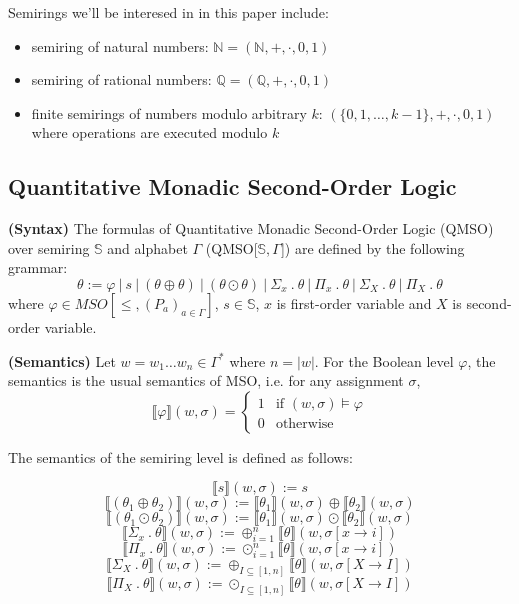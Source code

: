 \documentclass[12pt]{article}
\theoremstyle{definition}
\begin{document}
Semirings we'll be interesed in in this paper include:

\begin{itemize}
    \item semiring of natural numbers: $\mathbb{N} = (\mathbb{N}, +, \cdot, 0, 1)$
    \item semiring of rational numbers: $\mathbb{Q} = (\mathbb{Q}, +, \cdot, 0, 1)$
    \item finite semirings of numbers modulo arbitrary $k$: $(\{0,1,\ldots,k-1\}, +, \cdot, 0, 1)$ where operations are executed modulo $k$
\end{itemize}

\subsection{Quantitative Monadic Second-Order Logic}

\textbf{(Syntax)} The formulas of Quantitative Monadic Second-Order Logic (QMSO) over semiring $\mathbb{S}$ and alphabet $\Gamma$ (QMSO[$\mathbb{S}, \Gamma$]) are defined by the following grammar:
$$ \theta := \varphi \ | \ s \ | \ (\theta \oplus \theta) \ | \ (\theta \odot \theta) \ | \ \Sigma_x \ . \ \theta \ | \ \Pi_x \ . \ \theta \ | \ \Sigma_X \ . \ \theta \ | \ \Pi_X \ . \ \theta$$
where $\varphi \in MSO[\leq, (P_a)_{a \in \Gamma}]$, $s \in \mathbb{S}$, $x$ is first-order variable and $X$ is second-order variable.

\textbf{(Semantics)} Let $w 
= w_1 \dots w_n \in \Gamma^*$ where $n = |w|$. For the Boolean level $\varphi$, the semantics is the usual semantics of MSO, i.e. for any assignment $\sigma$,
\begin{equation*}
    \llbracket\varphi\rrbracket(w, \sigma) =
      \begin{cases}
        1 & \text{if $(w, \sigma) \models \varphi$}\\
        0 & \text{otherwise}
      \end{cases}       
\end{equation*}

The semantics of the semiring level is defined as follows:

$$\llbracket s\rrbracket(w, \sigma) := s$$
$$\llbracket(\theta_1 \oplus \theta_2)\rrbracket(w, \sigma) := \llbracket\theta_1\rrbracket(w, \sigma) \oplus \llbracket\theta_2\rrbracket(w, \sigma)$$
$$\llbracket(\theta_1 \odot \theta_2)\rrbracket(w, \sigma) := \llbracket\theta_1\rrbracket(w, \sigma) \odot \llbracket\theta_2\rrbracket(w, \sigma)$$
$$\llbracket \Sigma_x \ . \ \theta \rrbracket(w, \sigma) := \oplus^n_{i=1}\llbracket \theta \rrbracket (w, \sigma[x \rightarrow i])$$
$$\llbracket \Pi_x \ . \ \theta \rrbracket(w, \sigma) := \odot^n_{i=1}\llbracket \theta \rrbracket (w, \sigma[x \rightarrow i])$$
$$\llbracket \Sigma_X \ . \ \theta \rrbracket(w, \sigma) := \oplus_{I \subseteq [1,n]}\llbracket \theta \rrbracket (w, \sigma[X \rightarrow I])$$
$$\llbracket \Pi_X \ . \ \theta \rrbracket(w, \sigma) := \odot_{I \subseteq [1,n]}\llbracket \theta \rrbracket (w, \sigma[X \rightarrow I])$$
\end{document}
